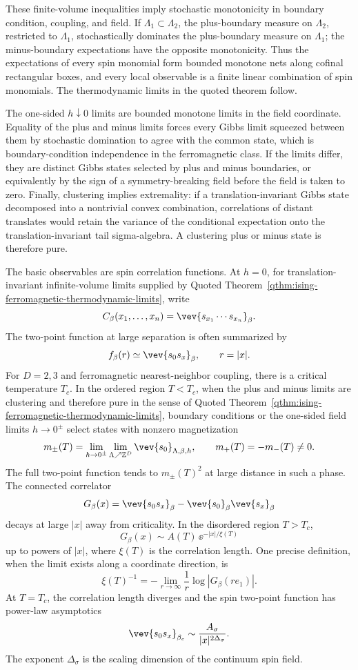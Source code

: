 These finite-volume inequalities imply stochastic monotonicity in boundary
condition, coupling, and field.  If
\(\Lambda_1\subset\Lambda_2\), the plus-boundary measure on \(\Lambda_2\),
restricted to \(\Lambda_1\), stochastically dominates the plus-boundary
measure on \(\Lambda_1\); the minus-boundary expectations have the opposite
monotonicity.  Thus the expectations of every spin monomial form bounded
monotone nets along cofinal rectangular boxes, and every local observable is a
finite linear combination of spin monomials.  The thermodynamic limits in the
quoted theorem follow.

The one-sided \(h\downarrow0\) limits are bounded monotone limits in the field
coordinate.  Equality of the plus and minus limits forces every Gibbs limit
squeezed between them by stochastic domination to agree with the common state,
which is boundary-condition independence in the ferromagnetic class.  If the
limits differ, they are distinct Gibbs states selected by plus and minus
boundaries, or equivalently by the sign of a symmetry-breaking field before
the field is taken to zero.  Finally, clustering implies extremality: if a
translation-invariant Gibbs state decomposed into a nontrivial convex
combination, correlations of distant translates would retain the variance of
the conditional expectation onto the translation-invariant tail
sigma-algebra.  A clustering plus or minus state is therefore pure.

The basic observables are spin correlation functions.  At \(h=0\), for
translation-invariant infinite-volume limits supplied by
Quoted Theorem~\ref{qthm:ising-ferromagnetic-thermodynamic-limits}, write
\[
  C_\beta(x_1,\ldots,x_n)
  =
  \vev{s_{x_1}\cdots s_{x_n}}_\beta .
\]
The two-point function at large separation is often summarized by
\[
  f_\beta(r)
  \simeq
  \vev{s_0s_x}_\beta,
  \qquad r=|x|.
\]
For \(D=2,3\) and ferromagnetic nearest-neighbor coupling, there is a critical
temperature \(T_c\).  In the ordered region \(T<T_c\), when the plus and minus
limits are clustering and therefore pure in the sense of
Quoted Theorem~\ref{qthm:ising-ferromagnetic-thermodynamic-limits}, boundary
conditions or the one-sided field limits \(h\to0^\pm\) select states with
nonzero magnetization
\[
  m_\pm(T)
  =
  \lim_{h\to0^\pm}\lim_{\Lambda\nearrow\mathbb Z^D}
  \vev{s_0}_{\Lambda,\beta,h},
  \qquad m_+(T)=-m_-(T)\neq0 .
\]
The full two-point function tends to \(m_\pm(T)^2\) at large distance in such a
phase.  The connected correlator
\[
  G_\beta(x)
  =
  \vev{s_0s_x}_\beta-\vev{s_0}_\beta\vev{s_x}_\beta
\]
decays at large \(|x|\) away from criticality.  In the disordered region
\(T>T_c\),
\[
  G_\beta(x)\sim A(T)\,\ee^{-|x|/\xi(T)}
\]
up to powers of \(|x|\), where \(\xi(T)\) is the correlation length.  One
precise definition, when the limit exists along a coordinate direction, is
\[
  \xi(T)^{-1}
  =
  -\lim_{r\to\infty}\frac1r\log |G_\beta(r e_1)|.
\]
At \(T=T_c\), the correlation length diverges and the spin two-point function
has power-law asymptotics
\[
  \vev{s_0s_x}_{\beta_c}
  \sim
  \frac{A_\sigma}{|x|^{2\Delta_\sigma}} .
\]
The exponent \(\Delta_\sigma\) is the scaling dimension of the continuum spin
field.

